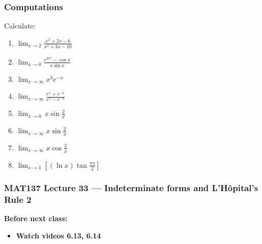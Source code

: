 \documentclass[14pt]{beamer}
\begin{document}
	\begin{frame}[t]
		\frametitle{Computations}

		Calculate:

		\begin{multicols}{2}
			\begin{enumerate}
				\item ${\displaystyle \lim_{x \to 2} \frac{x^{2}+2x - 6}{x^{2}+3x-10} }$

					\medskip

				\item ${\displaystyle \lim_{x \to 0} \frac{e^{2x^2}- \cos x}{x \sin x} }$

					\medskip

				\item ${\displaystyle \lim_{x \to \infty} x^3 e^{-x}}$

					\medskip

				\item ${\displaystyle \lim_{x \to \infty} \frac{e^{x} + e^{-x}}{e^{x} - e^{-x}} }$

					\medskip

				\item ${\displaystyle \lim_{x \to 0} \, x \sin \frac{2}{x} }$

					\medskip

				\item ${\displaystyle \lim_{x \to \infty} x \sin \frac{2}{x} }$

					\medskip

				\item ${\displaystyle \lim_{x \to \infty} x \cos \frac{2}{x} }$

					\medskip

				\item ${\displaystyle \lim_{x \to 1} \left[ \left( \ln x \right) \tan \frac{\pi x}{2} \right] }$

					\medskip
			\end{enumerate}
		\end{multicols}
	\end{frame}











\begin{frame}
	\frametitle{MAT137 Lecture 33 --- Indeterminate forms and L'H\^opital's Rule 2}

	\vfill
	{\bf Before next class:}
		\begin{itemize} \normalsize
			\item {\bf Watch videos 6.13, 6.14}
		\end{itemize}
\end{frame}
\end{document}
